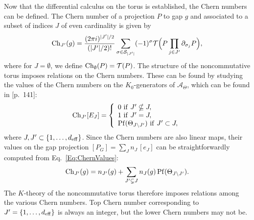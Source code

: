 \documentclass[
    10pt,
    aps,
    prb,
    twocolumn,
    floatfix,
    superscriptaddress,
]{revtex4-2}
\begin{document}
Now that the differential calculus on the torus is established, the Chern numbers can be defined.
The Chern number of a projection $P$ to gap $g$ and associated to a subset of indices $J$ of even cardinality is given by
\begin{equation}
	    {\rm Ch}_{J'}(g) = \frac{(2\pi i)^{|J'|/2}}{( |J'|/2 )!} \sum_{\sigma \in {\mathcal S}_{|J'|}} (-1)^\sigma {\mathcal T}\Big ( P \prod_{j \in J'} \partial_{\sigma_j}P \Big ) ,
\end{equation}
where for $J = \emptyset$, we define ${\rm Ch}_\emptyset(P) = {\mathcal T}(P)$.
The structure of the noncommutative torus imposes relations on the Chern numbers.
These can be found by studying the values of the Chern numbers on the $K_0$-generators of $\mathcal{A}_\Theta$, which can be found in \cite{Prodan2016}[p.~141]:
\begin{equation}\label{Eq:ChernValues}
{\rm Ch}_{J'} [E_J] = \left \{ 
\begin{array}{l}
0 \ {\rm if} \ J'\nsubseteq J  , \\
1 \ {\rm if} \ J' = J , \\
{\rm Pf}(\Theta_{J\setminus J'}) \ {\rm if} \ J' \subset J,
\end{array}
\right .  
\end{equation}
where $ J, J' \subset \{1,\ldots,{d_\mathrm{eff}}\}$.
Since the Chern numbers are also linear maps, their values on the gap projection $[P_G] = \sum_{J} n_J \, [e_J]$ can be straightforwardly computed from Eq.~\eqref{Eq:ChernValues}:
\begin{equation}\label{Eq:ChernVal}
{\rm Ch}_{J'}(g) = n_{J'}(g) + \sum_{J' \subsetneq J} n_J(g) \, {\rm Pf}(\Theta_{J\setminus J'}).
\end{equation} 
The $K$-theory of the noncommutative torus therefore imposes relations among the various Chern numbers. 
Top Chern number corresponding to $J'=\{1,\ldots,{d_\mathrm{eff}}\}$ is always an integer, but the lower Chern numbers may not be.
\end{document}
